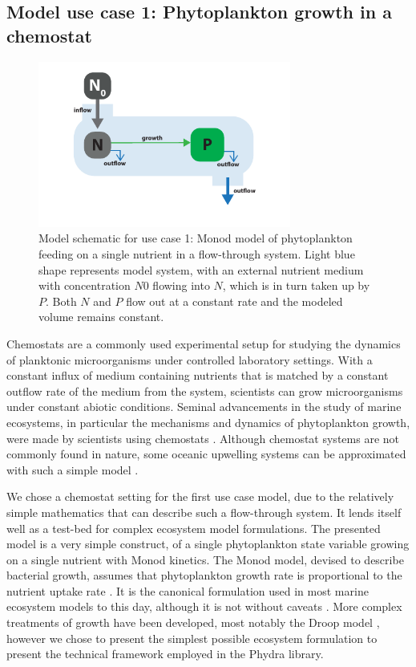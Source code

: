 \documentclass[journal abbreviation, manuscript]{copernicus}
\begin{document}
\subsection{Model use case 1: Phytoplankton growth in a chemostat}

\begin{figure}[t]
\includegraphics[width=8.3cm]{Figures/firstdraft_schematics/01_schematics_Chemostat.pdf}
\caption{Model schematic for use case 1: Monod model of phytoplankton feeding on a single nutrient in a flow-through system. Light blue shape represents model system, with an external nutrient medium with concentration $N0$ flowing into $N$, which is in turn taken up by $P$. Both $N$ and $P$ flow out at a constant rate and the modeled volume remains constant.}
\label{Figure:ModelSchematics_1}
\end{figure}

Chemostats are a commonly used experimental setup for studying the dynamics of planktonic microorganisms under controlled laboratory settings. With a constant influx of medium containing nutrients that is matched by a constant outflow rate of the medium from the system, scientists can grow microorganisms under constant abiotic conditions. Seminal advancements in the study of marine ecosystems, in particular the mechanisms and dynamics of phytoplankton growth, were made by scientists using chemostats \citep[e.g.,][]{Droop1968VitaminLutheri}. Although chemostat systems are not commonly found in nature, some oceanic upwelling systems can be approximated with such a simple model \citep{Haefner2005ModelingApplications}.

We chose a chemostat setting for the first use case model, due to the relatively simple mathematics that can describe such a flow-through system. It lends itself well as a test-bed for complex ecosystem model formulations. The presented model is a very simple construct, of a single phytoplankton state variable growing on a single nutrient with Monod kinetics. The Monod model, devised to describe bacterial growth, assumes that phytoplankton growth rate is proportional to the nutrient uptake rate \citep{Monod1942RecherchesBacteriennes}.
It is the canonical formulation used in most marine ecosystem models to this day, although it is not without caveats \citep{Hellweger2017a}. More complex treatments of growth have been developed, most notably the Droop model \citep[e.g.,][]{Droop1968VitaminLutheri}, however we chose to present the simplest possible ecosystem formulation to present the technical framework employed in the Phydra library.
\end{document}
